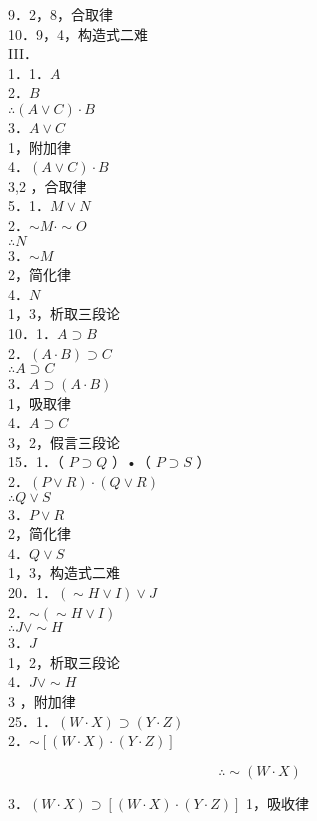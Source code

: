 9．2，8，合取律\\
10．9，4，构造式二难\\
III．\\
1．1．$A$\\
2．$B$\\
$\therefore(A \vee C) \cdot B$\\
3．$A \vee C$\\
1，附加律\\
4．$(A \vee C) \cdot B$\\
3,2 ，合取律\\
5．1．$M \vee N$\\
2．$\sim M \cdot \sim O$\\
$\therefore N$\\
3．$\sim M$\\
2，简化律\\
4．$N$\\
1，3，析取三段论\\
10．1．$A \supset B$\\
2．$(A \cdot B) \supset C$\\
$\therefore A \supset C$\\
3．$A \supset(A \cdot B)$\\
1，吸取律\\
4．$A \supset C$\\
3，2，假言三段论\\
15．1．（ $P \supset Q$ ）•（ $P \supset S$ ）\\
2．$(P \vee R) \cdot(Q \vee R)$\\
$\therefore Q \vee S$\\
3．$P \vee R$\\
2，简化律\\
4．$Q \vee S$\\
1，3，构造式二难\\
20．1．$(\sim H \vee I) \vee J$\\
2．$\sim(\sim H \vee I)$\\
$\therefore J \vee \sim H$\\
3．$J$\\
1，2，析取三段论\\
4．$J \vee \sim H$\\
3 ，附加律\\
25．1．$(W \cdot X) \supset(Y \cdot Z)$\\
2．$\sim[(W \cdot X) \cdot(Y \cdot Z)]$

$$
\therefore \sim(W \cdot X)
$$

3．$(W \cdot X) \supset[(W \cdot X) \cdot(Y \cdot Z)]$ 1，吸收律

